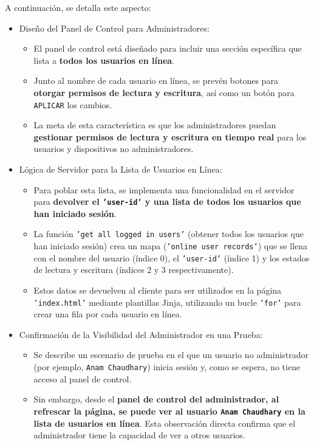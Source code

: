 \documentclass{report}
\begin{document}
A continuación, se detalla este aspecto:
\begin{itemize}
    \item Diseño del Panel de Control para Administradores:
    \begin{itemize}
        \item El panel de control está diseñado para incluir una sección específica que lista a \textbf{todos los usuarios en línea}.
        \item Junto al nombre de cada usuario en línea, se prevén botones para \textbf{otorgar permisos de lectura y escritura}, así como un botón 
              para \texttt{APLICAR} los cambios.
        \item La meta de esta característica es que los administradores puedan \textbf{gestionar permisos de lectura y escritura en tiempo real} para 
              los usuarios y dispositivos no administradores.
    \end{itemize}
    
    \item Lógica de Servidor para la Lista de Usuarios en Línea:
    \begin{itemize}
        \item Para poblar esta lista, se implementa una funcionalidad en el servidor para \textbf{devolver el \texttt{'user-id'} y una lista de todos los 
              usuarios que han iniciado sesión}.
        \item La función \texttt{'get all logged in users'} (obtener todos los usuarios que han iniciado sesión) crea un mapa (\texttt{'online user records'}) 
              que se llena con el nombre del usuario (índice 0), el \texttt{'user-id'} (índice 1) y los estados de lectura y escritura (índices 2 y 3 
              respectivamente).
        \item Estos datos se devuelven al cliente para ser utilizados en la página \texttt{'index.html'} mediante plantillas Jinja, utilizando un 
              bucle \texttt{'for'} para crear una fila por cada usuario en línea.
    \end{itemize}
    
    \item Confirmación de la Visibilidad del Administrador en una Prueba:
    \begin{itemize}
        \item Se describe un escenario de prueba en el que un usuario no administrador (por ejemplo, \texttt{Anam Chaudhary}) inicia sesión 
              y, como se espera, no tiene acceso al panel de control.
        \item Sin embargo, desde el \textbf{panel de control del administrador, al refrescar la página, se puede ver al usuario \texttt{Anam Chaudhary} 
              en la lista de usuarios en línea}. Esta observación directa confirma que el administrador tiene la capacidad de ver a otros usuarios.
    \end{itemize}


\end{itemize}
\end{document}
